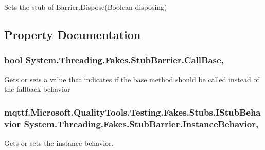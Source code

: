 Sets the stub of Barrier.\-Dispose(\-Boolean disposing)



\subsection{Property Documentation}
\hypertarget{class_system_1_1_threading_1_1_fakes_1_1_stub_barrier_a7006aa20768ee26fcaede0156a6eeeab}{
\subsubsection[{Call\-Base}]{\setlength{\rightskip}{0pt plus 5cm}bool System.\-Threading.\-Fakes.\-Stub\-Barrier.\-Call\-Base\hspace{0.3cm}{\ttfamily [get]}, {\ttfamily [set]}}}\label{class_system_1_1_threading_1_1_fakes_1_1_stub_barrier_a7006aa20768ee26fcaede0156a6eeeab}


Gets or sets a value that indicates if the base method should be called instead of the fallback behavior

\hypertarget{class_system_1_1_threading_1_1_fakes_1_1_stub_barrier_a044d1429d260f502e808ce29bccb4dcd}{
\subsubsection[{Instance\-Behavior}]{\setlength{\rightskip}{0pt plus 5cm}mqttf.\-Microsoft.\-Quality\-Tools.\-Testing.\-Fakes.\-Stubs.\-I\-Stub\-Behavior System.\-Threading.\-Fakes.\-Stub\-Barrier.\-Instance\-Behavior\hspace{0.3cm}{\ttfamily [get]}, {\ttfamily [set]}}}\label{class_system_1_1_threading_1_1_fakes_1_1_stub_barrier_a044d1429d260f502e808ce29bccb4dcd}


Gets or sets the instance behavior.

